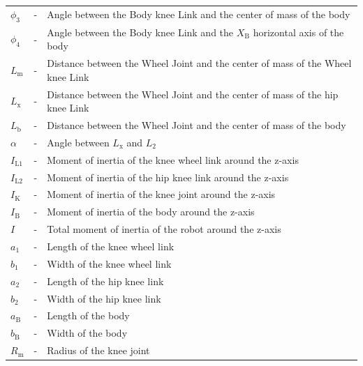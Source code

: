 \begin{table}[h!]
\begin{tabular}{lcl}
        $\phi_{\mathrm{3}}$ & - & Angle between the Body knee Link and the center of mass of the body \\
        $\phi_{\mathrm{4}}$ & - & Angle between the Body knee Link and the $X_{\mathrm{B}}$ horizontal axis of the body \\
        $L_{\mathrm{m}}$ & - & Distance between the Wheel Joint and the center of mass of the Wheel knee Link \\
        $L_{\mathrm{x}}$ & - & Distance between the Wheel Joint and the center of mass of the hip knee Link \\
        $L_{\mathrm{b}}$ & - & Distance between the Wheel Joint and the center of mass of the body \\
        $\alpha$ & - & Angle between $L_{\mathrm{x}}$ and $L_{\mathrm{2}}$ \\
        $I_{\mathrm{L1}}$ & - & Moment of inertia of the knee wheel link around the z-axis \\
        $I_{\mathrm{L2}}$ & - & Moment of inertia of the hip knee link around the z-axis \\
        $I_{\mathrm{K}}$ & - & Moment of inertia of the knee joint around the z-axis \\
        $I_{\mathrm{B}}$ & - & Moment of inertia of the body around the z-axis \\
        $I$ & - & Total moment of inertia of the robot around the z-axis \\
        $a_{\mathrm{1}}$ & - & Length of the knee wheel link \\
        $b_{\mathrm{1}}$ & - & Width of the knee wheel link \\
        $a_{\mathrm{2}}$ & - & Length of the hip knee link \\
        $b_{\mathrm{2}}$ & - & Width of the hip knee link \\
        $a_{\mathrm{B}}$ & - & Length of the body \\
        $b_{\mathrm{B}}$ & - & Width of the body \\
        $R_{\mathrm{m}}$ & - & Radius of the knee joint \\
        \bottomrule
    \end{tabular}
\end{table}


	\newpage
